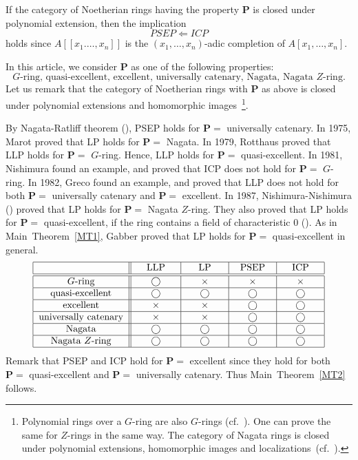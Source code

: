 \documentclass[11pt,a4paper]{amsart}
\theoremstyle{definition}
\theoremstyle{remark}
\begin{document}
If the category of Noetherian rings having the property $\mathbf{P}$ is closed
under polynomial extension, then the implication 
\[
PSEP \Longleftarrow ICP
\]
holds since $A[[x_1. \ldots, x_n]]$ is the $(x_1, \ldots, x_n)$-adic completion of $A[x_1, \ldots, x_n]$.

In this article, we consider $\mathbf{P}$ as one of the following properties:
\[
\mbox{$G$-ring, quasi-excellent, excellent, universally catenary, Nagata, Nagata $Z$-ring}.
\]
Let us remark that the category of Noetherian rings with $\mathbf{P}$ as above is closed under polynomial extensions and homomorphic images~\footnote{Polynomial rings over a $G$-ring are also $G$-rings (cf.\ \cite[Theorem 77]{Ma80}). One can prove the same for $Z$-rings in the same way. 
The category of Nagata rings is closed under polynomial extensions, homomorphic images and localizations~(cf.\ \cite[Theorem 72]{Ma80}).}.


By Nagata-Ratliff theorem (\cite[Theorem 3.1]{Rat}),  PSEP holds for $\mathbf{P}=$ universally catenary. In 1975, Marot \cite{Ma75}  proved that LP holds for $\mathbf{P}=$ Nagata. In 1979, Rotthaus \cite{Rott79} proved that LLP holds for $\mathbf{P}=$ $G$-ring. Hence, LLP holds for $\mathbf{P}=$ quasi-excellent. In 1981, Nishimura \cite{Nishimura81} found an example, and proved that ICP does not hold for $\mathbf{P}=$ $G$-ring. In 1982, Greco \cite{Gre82} found an example, and proved that LLP does not hold for both $\mathbf{P}=$ universally catenary and  $\mathbf{P}=$ excellent. In 1987, Nishimura-Nishimura (\cite[Theorem A]{Nishimura87}) proved that LP holds for $\mathbf{P}=$ Nagata $Z$-ring. They also proved that  LP holds for $\mathbf{P}=$ quasi-excellent, if the ring contains a field of characteristic $0$ (\cite[Theorem B]{Nishimura87}). 
As in Main~Theorem~\ref{MT1}, Gabber proved that LP holds for $\mathbf{P}=$ quasi-excellent in general.
\[
\begin{tabular}{|c||c|c|c|c|}
\hline
& LLP & LP & PSEP & ICP \\ 
\hline\hline
\mbox{$G$-ring} & \hphantom{AA}$\bigcirc$\hphantom{AA} & \hphantom{AA}$\times$\hphantom{AA} & \hphantom{AA}$\times$\hphantom{AA} & \hphantom{AA}$\times$\hphantom{AA} \\ \hline
\mbox{quasi-excellent} & $\bigcirc$ & $\bigcirc$ & $\bigcirc$ & $\bigcirc$ \\ \hline
\mbox{excellent} &  $\times$ &  $\times$ & $\bigcirc$ & $\bigcirc$ \\ \hline
\mbox{universally catenary} &  $\times$ &  $\times$ & $\bigcirc$ & $\bigcirc$ \\ \hline
\mbox{Nagata} &  $\bigcirc$ &  $\bigcirc$ & $\bigcirc$ & $\bigcirc$ \\ \hline
\mbox{Nagata $Z$-ring} &   $\bigcirc$ &  $\bigcirc$ & $\bigcirc$ & $\bigcirc$ \\ \hline
\end{tabular}
\]
Remark that PSEP and ICP hold for $\mathbf{P}=$ excellent since they hold for both $\mathbf{P}=$ quasi-excellent and  $\mathbf{P}=$ universally catenary.
Thus Main~Theorem~\ref{MT2} follows.
\end{document}
